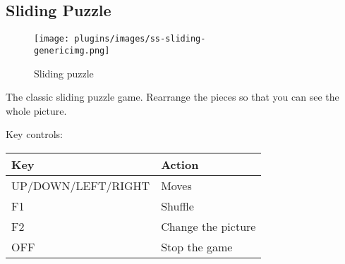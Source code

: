 \subsection{Sliding Puzzle}
\begin{figure}[h!]
\begin{center}
\texttt{[image: plugins/images/ss-sliding-\\genericimg.png]}
\end{center}
\caption{Sliding puzzle}
\end{figure}

The classic sliding puzzle game.  Rearrange the pieces so that you can
see the whole picture.

Key controls:

\begin{table}[h!]
\begin{center}
\begin{tabular}{@{}ll@{}}\toprule
\textbf{Key} & \textbf{Action}\\\midrule
UP/DOWN/LEFT/RIGHT & Moves \\
F1 & Shuffle \\
F2 & Change the picture \\
OFF & Stop the game \\\bottomrule
\end{tabular}
\end{center}
\end{table}
